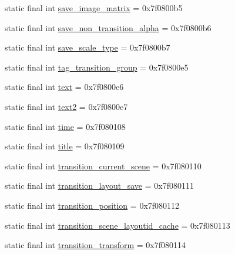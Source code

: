 \begin{DoxyCompactItemize}
static final int \mbox{\hyperlink{classandroid_1_1support_1_1transition_1_1_r_1_1id_acab4a6d9fd322d835040991ed5709099}{save\+\_\+image\+\_\+matrix}} = 0x7f0800b5
\item 
static final int \mbox{\hyperlink{classandroid_1_1support_1_1transition_1_1_r_1_1id_a455fe1ba61028d91040bd0b7434c275a}{save\+\_\+non\+\_\+transition\+\_\+alpha}} = 0x7f0800b6
\item 
static final int \mbox{\hyperlink{classandroid_1_1support_1_1transition_1_1_r_1_1id_ad2b7283595e0f3038bc3ee7843eac9ba}{save\+\_\+scale\+\_\+type}} = 0x7f0800b7
\item 
static final int \mbox{\hyperlink{classandroid_1_1support_1_1transition_1_1_r_1_1id_a320c3fd792e45b64cca6aeaab36b0a86}{tag\+\_\+transition\+\_\+group}} = 0x7f0800e5
\item 
static final int \mbox{\hyperlink{classandroid_1_1support_1_1transition_1_1_r_1_1id_ac4cca2465737e7f17495b03f308e5bc8}{text}} = 0x7f0800e6
\item 
static final int \mbox{\hyperlink{classandroid_1_1support_1_1transition_1_1_r_1_1id_a0e51e599d4bbbbe0d0016d57657ce04d}{text2}} = 0x7f0800e7
\item 
static final int \mbox{\hyperlink{classandroid_1_1support_1_1transition_1_1_r_1_1id_a74264c86583c1f10acdd11d3f2c08e7e}{time}} = 0x7f080108
\item 
static final int \mbox{\hyperlink{classandroid_1_1support_1_1transition_1_1_r_1_1id_ac37d5257839f0ecba0fac3657bd6b198}{title}} = 0x7f080109
\item 
static final int \mbox{\hyperlink{classandroid_1_1support_1_1transition_1_1_r_1_1id_aef3ea53ee761d0649374566d52e85781}{transition\+\_\+current\+\_\+scene}} = 0x7f080110
\item 
static final int \mbox{\hyperlink{classandroid_1_1support_1_1transition_1_1_r_1_1id_a0da519ef0e965f22493e434e46d6b368}{transition\+\_\+layout\+\_\+save}} = 0x7f080111
\item 
static final int \mbox{\hyperlink{classandroid_1_1support_1_1transition_1_1_r_1_1id_a382451efc0f4b0eb63a180489417e330}{transition\+\_\+position}} = 0x7f080112
\item 
static final int \mbox{\hyperlink{classandroid_1_1support_1_1transition_1_1_r_1_1id_a38d13adf0b16756ebfc96af4df5a4e7b}{transition\+\_\+scene\+\_\+layoutid\+\_\+cache}} = 0x7f080113
\item 
static final int \mbox{\hyperlink{classandroid_1_1support_1_1transition_1_1_r_1_1id_a262eee6539d89b6200234e0c27e5d384}{transition\+\_\+transform}} = 0x7f080114
\end{DoxyCompactItemize}
